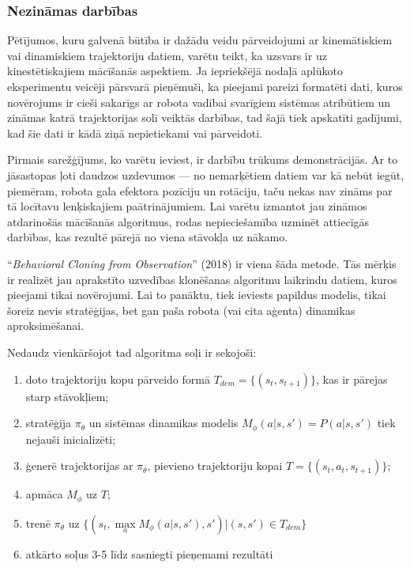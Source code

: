 \documentclass[12pt, a4paper]{article}
\numberwithin{equation}{section} %
\begin{document}
\subsubsection{Nezināmas darbības}

Pētījumos, kuru galvenā būtība ir dažādu veidu pārveidojumi ar kinemātiskiem vai dinamiskiem trajektoriju datiem, varētu teikt, ka uzsvars ir uz kinestētiskajiem mācīšanās aspektiem. Ja iepriekšējā nodaļā aplūkoto eksperimentu veicēji pārsvarā pieņēmuši, ka pieejami pareizi formatēti dati, kuros novērojums ir cieši sakarīgs ar robota vadībai svarīgiem sistēmas atribūtiem un zināmas katrā trajektorijas solī veiktās darbības, tad šajā tiek apskatīti gadījumi, kad šie dati ir kādā ziņā nepietiekami vai pārveidoti.

Pirmais sarežģījums, ko varētu ieviest, ir darbību trūkums demonstrācijās. Ar to jāsastopas ļoti daudzos uzdevumos --- no nemarķētiem datiem var kā nebūt iegūt, piemēram, robota gala efektora pozīciju un rotāciju, taču nekas nav zināms par tā locītavu lenķiskajiem paātrinājumiem. Lai varētu izmantot jau zināmos atdarinošās mācīšanās algoritmus, rodas nepieciešamība uzminēt attiecīgās darbības, kas rezultē pārejā no viena stāvokļa uz nākamo.

``\textit{Behavioral Cloning from Observation}'' \cite{torabi2018behavioral} (2018) ir viena šāda metode. Tās mērķis ir realizēt jau aprakstīto uzvedības klonēšanas algoritmu laikrindu datiem, kuros pieejami tikai novērojumi. Lai to panāktu, tiek ieviests papildus modelis, tikai šoreiz nevis stratēģijas, bet gan paša robota (vai cita aģenta) dinamikas aproksimēšanai.

Nedaudz vienkāršojot tad algoritma soļi ir sekojoši:

\begin{enumerate}
    \item doto trajektoriju kopu pārveido formā $T_{dem}=\lbrace (s_t, s_{t+1}) \rbrace$, kas ir pārejas starp stāvokļiem;
    \item stratēģija $\pi_{\theta}$ un sistēmas dinamikas modelis $M_{\phi}(a \vert s,s')=P(a \vert s, s')$ tiek nejauši inicializēti;
    \item ģenerē trajektorijas ar $\pi_{\theta}$, pievieno trajektoriju kopai $T=\lbrace (s_t, a_t, s_{t+1}) \rbrace$;
    \item apmāca $M_{\phi}$ uz $T$;
    \item trenē $\pi_{\theta}$ uz $\lbrace (s_t, \max\limits_{a}M_{\phi}(a \vert s, s'), s')\vert (s, s') \in T_{dem} \rbrace$
    \item atkārto soļus 3-5 līdz sasniegti pieņemami rezultāti
\end{enumerate}
\end{document}
